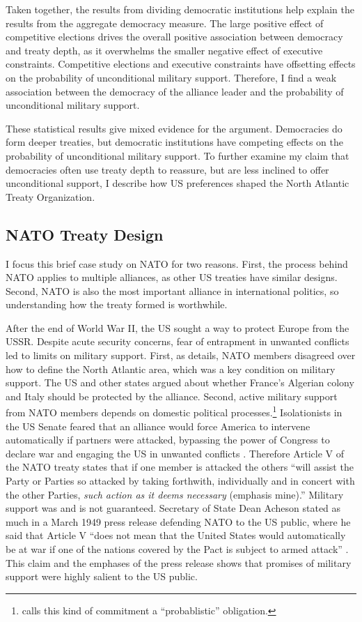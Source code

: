 \documentclass[12pt]{article}
\begin{document}
Taken together, the results from dividing democratic institutions help explain the results from the aggregate democracy measure. 
The large positive effect of competitive elections drives the overall positive association between democracy and treaty depth, as it overwhelms the smaller negative effect of executive constraints. 
Competitive elections and executive constraints have offsetting effects on the probability of unconditional military support. 
Therefore, I find a weak association between the democracy of the alliance leader and the probability of unconditional military support. 


These statistical results give mixed evidence for the argument. 
Democracies do form deeper treaties, but democratic institutions have competing effects on the probability of unconditional military support. 
To further examine my claim that democracies often use treaty depth to reassure, but are less inclined to offer unconditional support, I describe how US preferences shaped the North Atlantic Treaty Organization. 


\subsection{NATO Treaty Design}


I focus this brief case study on NATO for two reasons. 
First, the process behind NATO applies to multiple alliances, as other US treaties have similar designs. 
Second, NATO is also the most important alliance in international politics, so understanding how the treaty formed is worthwhile. 


After the end of World War II, the US sought a way to protect Europe from the USSR. 
Despite acute security concerns, fear of entrapment in unwanted conflicts led to limits on military support. 
First, as \citet{Poast2019a} details, NATO members disagreed over how to define the North Atlantic area, which was a key condition on military support. 
The US and other states argued about whether France's Algerian colony and Italy should be protected by the alliance. 
Second, active military support from NATO members depends on domestic political processes.\footnote{\citet{Benson2012} calls this kind of commitment a ``probablistic'' obligation.} 
Isolationists in the US Senate feared that an alliance would force America to intervene automatically if partners were attacked, bypassing the power of Congress to declare war and engaging the US in unwanted conflicts \citep[pg. 280-1]{Acheson1969}.
Therefore Article V of the NATO treaty states that if one member is attacked the others ``will assist the Party or Parties so attacked by taking forthwith, individually and in concert with the other Parties, \emph{such action as it deems necessary} (emphasis mine).'' 
Military support was and is not guaranteed. 
Secretary of State Dean Acheson stated as much in a March 1949 press release defending NATO to the US public, where he said that Article V ``does not mean that the United States would automatically be at war if one of the nations covered by the Pact is subject to armed attack'' \citep{Acheson1949}.
This claim and the emphases of the press release shows that promises of military support were highly salient to the US public.
\end{document}
